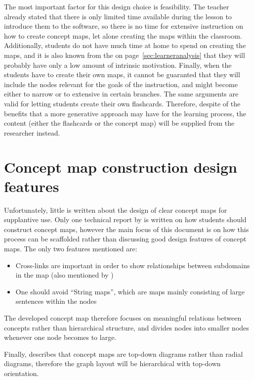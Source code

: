 The most important factor for this design choice is feasibility. The teacher already stated that there is only limited time available during the lesson to introduce them to the software, so there is no time for extensive instruction on how to create concept maps, let alone creating the maps within the classroom. Additionally, students do not have much time at home to spend on creating the maps, and it is also known from the  on page~\ref{sec:learneranalysis} that they will probably have only a low amount of intrinsic motivation. Finally, when the students have to create their own maps, it cannot be guaranted that they will include the nodes relevant for the goals of the instruction, and might become either to narrow or to extensive in certain branches. The same arguments are valid for letting students create their own flashcards. Therefore, despite of the benefits that a more generative approach may have for the learning process, the content (either the flashcards or the concept map) will be supplied from the researcher instead.

    \section{Concept map construction design features}
    \label{sec:cmapframework}

Unfortunately, little is written about the design of clear concept maps for supplantive use. Only one technical report by \cite{constructcmaps} is written on how students should construct concept maps, however the main focus of this document is on how this process can be scaffolded rather than discussing good design features of concept maps. The only two features mentioned are:
%
\begin{itemize}
    \item Cross-links are important in order to show relationships between subdomains in the map (also mentioned by )
    \item One should avoid ``String maps'', which are maps mainly consisting of large sentences within the nodes
\end{itemize}
%
The developed concept map therefore focuses on meaningful relations between concepts rather than hierarchical structure, and divides nodes into smaller nodes whenever one node becomes to large.

Finally,  describes that concept maps are top-down diagrams rather than radial diagrams, therefore the graph layout will be hierarchical with top-down orientation.

